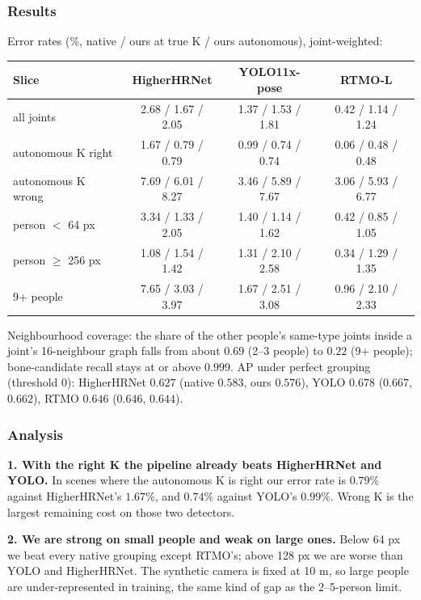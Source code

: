 \subsubsection{Results}

Error rates (\%, native / ours at true K / ours autonomous), joint-weighted:

{\small
\begin{tabular}{lccc}
\hline
\textbf{Slice} & \textbf{HigherHRNet} & \textbf{YOLO11x-pose} & \textbf{RTMO-L} \\
\hline
all joints                   & 2.68 / 1.67 / 2.05 & 1.37 / 1.53 / 1.81 & 0.42 / 1.14 / 1.24 \\
autonomous K right           & 1.67 / 0.79 / 0.79 & 0.99 / 0.74 / 0.74 & 0.06 / 0.48 / 0.48 \\
autonomous K wrong           & 7.69 / 6.01 / 8.27 & 3.46 / 5.89 / 7.67 & 3.06 / 5.93 / 6.77 \\
person $<$ 64 px             & 3.34 / 1.33 / 2.05 & 1.40 / 1.14 / 1.62 & 0.42 / 0.85 / 1.05 \\
person $\geq$ 256 px         & 1.08 / 1.54 / 1.42 & 1.31 / 2.10 / 2.58 & 0.34 / 1.29 / 1.35 \\
9+ people                    & 7.65 / 3.03 / 3.97 & 1.67 / 2.51 / 3.08 & 0.96 / 2.10 / 2.33 \\
\hline
\end{tabular}
}

\vspace{0.5em}

Neighbourhood coverage: the share of the other people's same-type joints inside a joint's 16-neighbour graph falls from about $0.69$ (2--3 people) to $0.22$ (9+ people); bone-candidate recall stays at or above $0.999$.
AP under perfect grouping (threshold 0): HigherHRNet $0.627$ (native $0.583$, ours $0.576$), YOLO $0.678$ ($0.667$, $0.662$), RTMO $0.646$ ($0.646$, $0.644$).

\subsubsection{Analysis}

\textbf{1. With the right K the pipeline already beats HigherHRNet and YOLO.} In scenes where the autonomous K is right our error rate is $0.79\%$ against HigherHRNet's $1.67\%$, and $0.74\%$ against YOLO's $0.99\%$. Wrong K is the largest remaining cost on those two detectors.

\textbf{2. We are strong on small people and weak on large ones.} Below 64 px we beat every native grouping except RTMO's; above 128 px we are worse than YOLO and HigherHRNet. The synthetic camera is fixed at 10 m, so large people are under-represented in training, the same kind of gap as the 2--5-person limit.

